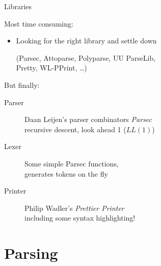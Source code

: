 \documentclass{beamer}
\begin{document}
\begin{frame}{Libraries}

  Most time consuming:

  \begin{itemize}
    \item Looking for the right library and settle down

    (Parsec, Attoparse, Polyparse, UU ParseLib, \\
     Pretty, WL-PPrint, \ldots)
  \end{itemize}

  \pause
  But finally:

  \begin{description}
    \item[Parser]  Daan Leijen's parser combinators \emph{Parsec}\\
                   recursive descent, look ahead 1 ($LL(1)$)
    \item[Lexer]   Some simple Parsec functions,\\
                   generates tokens on the fly
    \item[Printer] Philip Wadler's \emph{Prettier Printer}\\
                   including some syntax highlighting!
  \end{description}

\end{frame}

\section{Parsing}
\subsection*{}
\end{document}
